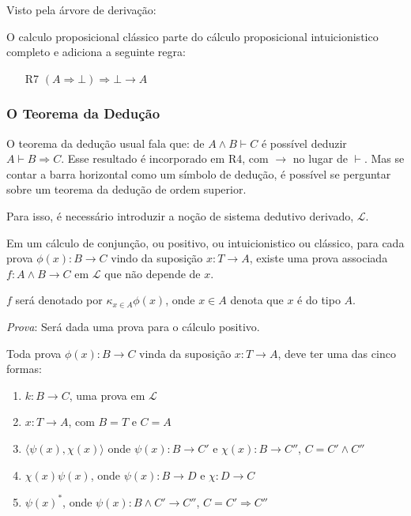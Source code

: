 \documentclass[../main.tex]{subfiles}
\begin{document}
Visto pela árvore de derivação:

\begin{definition}
    O calculo proposicional clássico parte do cálculo proposicional intuicionistico completo e adiciona a seguinte regra:
    \begin{enumerate}
        \item[R7] $(A \Rightarrow \bot) \Rightarrow \bot \to A$ 
    \end{enumerate}
\end{definition}

\subsubsection{O Teorema da Dedução}

O teorema da dedução usual fala que: de $A \land B \vdash C$ é possível deduzir $A \vdash B \Rightarrow C$. Esse resultado é incorporado em R4, com $\to$ no lugar de $\vdash$. Mas se contar a barra horizontal como um símbolo de dedução, é possível se perguntar sobre um teorema da dedução de ordem superior. 

Para isso, é necessário introduzir a noção de sistema dedutivo derivado, $\mathcal{L}$.

\begin{proposition}
    Em um cálculo de conjunção, ou  positivo, ou intuicionistico ou clássico, para cada prova $\phi(x) : B \to C$ vindo da suposição $x : T \to A$, existe uma prova associada $f : A \land B \to C$ em $\mathcal{L}$ que não depende de $x$.
\end{proposition}

$f$ será denotado por $\kappa_{x \in A}\phi(x)$, onde $x \in A$ denota que $x$ é do tipo $A$.

\emph{Prova}: Será dada uma prova para o cálculo positivo.

Toda prova $\phi(x) : B \to C$ vinda da suposição $x : T \to A$, deve ter uma das cinco formas:

\begin{enumerate}[label=(\roman*)]
    \item $k : B \to C$, uma prova em $\mathcal{L}$
    \item $x : T \to A$, com $B = T$ e $C = A$
    \item $\langle \psi(x), \chi(x) \rangle$ onde $\psi(x) : B \to C'$ e $\chi(x) : B \to C''$, $C = C' \land C''$
    \item $\chi(x)\psi(x)$, onde $\psi(x) : B \to D$ e $\chi : D \to C$
    \item $\psi(x)^{\ast}$, onde $\psi(x) : B \land C' \to C''$, $C = C' \Rightarrow C''$
\end{enumerate}
\end{document}

